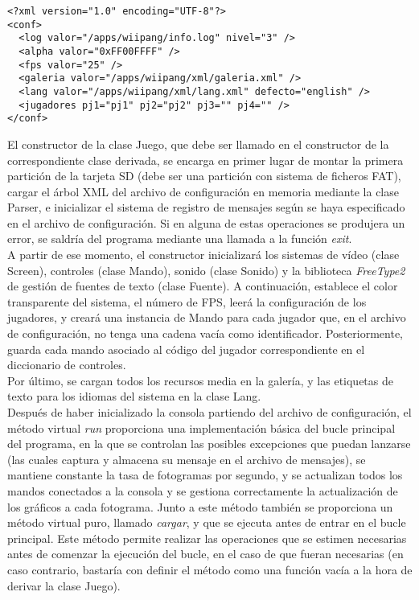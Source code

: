 \begin{lstlisting}[style=XML]
<?xml version="1.0" encoding="UTF-8"?>
<conf>
  <log valor="/apps/wiipang/info.log" nivel="3" />
  <alpha valor="0xFF00FFFF" />
  <fps valor="25" />
  <galeria valor="/apps/wiipang/xml/galeria.xml" />
  <lang valor="/apps/wiipang/xml/lang.xml" defecto="english" />
  <jugadores pj1="pj1" pj2="pj2" pj3="" pj4="" />
</conf>
\end{lstlisting}

El constructor de la clase Juego, que debe ser llamado en el constructor de la correspondiente clase derivada, se encarga en primer lugar de montar la primera partición de la tarjeta SD (debe ser una partición con sistema de ficheros FAT), cargar el árbol XML del archivo de configuración en memoria mediante la clase Parser, e inicializar el sistema de registro de mensajes según se haya especificado en el archivo de configuración. Si en alguna de estas operaciones se produjera un error, se saldría del programa mediante una llamada a la función \emph{exit}.\\

A partir de ese momento, el constructor inicializará los sistemas de vídeo (clase Screen), controles (clase Mando), sonido (clase Sonido) y la biblioteca \emph{FreeType2} de gestión de fuentes de texto (clase Fuente). A continuación, establece el color transparente del sistema, el número de FPS, leerá la configuración de los jugadores, y creará una instancia de Mando para cada jugador que, en el archivo de configuración, no tenga una cadena vacía como identificador. Posteriormente, guarda cada mando asociado al código del jugador correspondiente en el diccionario de controles.\\

Por último, se cargan todos los recursos media en la galería, y las etiquetas de texto para los idiomas del sistema en la clase Lang.\\

Después de haber inicializado la consola partiendo del archivo de configuración, el método virtual \emph{run} proporciona una implementación básica del bucle principal del programa, en la que se controlan las posibles excepciones que puedan lanzarse (las cuales captura y almacena su mensaje en el archivo de mensajes), se mantiene constante la tasa de fotogramas por segundo, y se actualizan todos los mandos conectados a la consola y se gestiona correctamente la actualización de los gráficos a cada fotograma. Junto a este método también se proporciona un método virtual puro, llamado \emph{cargar}, y que se ejecuta antes de entrar en el bucle principal. Este método permite realizar las operaciones que se estimen necesarias antes de comenzar la ejecución del bucle, en el caso de que fueran necesarias (en caso contrario, bastaría con definir el método como una función vacía a la hora de derivar la clase Juego).\\


